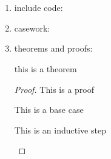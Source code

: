 \documentclass[12pt]{article}
\begin{document}
\section{}
    \begin{enumerate}
        \item
            include code:

        \item
            casework:

        \item
            theorems and proofs:
            \begin{theorem}
                this is a theorem
            \end{theorem}
            \begin{proof}
                This is a proof
                \begin{basecase}
                    This is a base case
                \end{basecase}
                \begin{induction}
                    This is an inductive step
                \end{induction}
            \end{proof}

    \end{enumerate}
\end{document}
